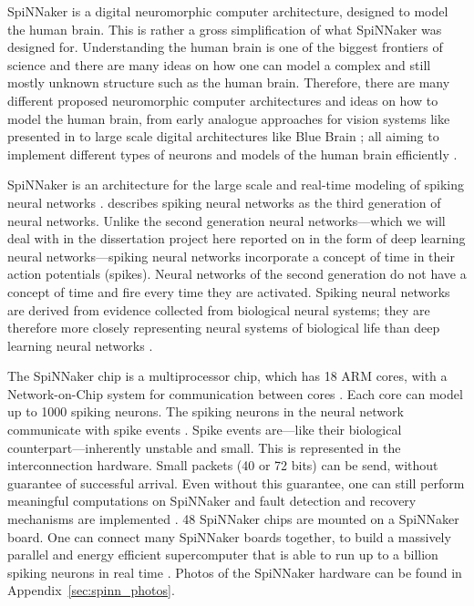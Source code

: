 \documentclass{article}
\begin{document}
SpiNNaker is a digital neuromorphic computer architecture,
designed to model the human brain.
This is rather a gross simplification of what SpiNNaker was
designed for.
Understanding the human brain is one of the biggest
frontiers of science and there are many ideas on how one
can model a complex and still mostly unknown structure such
as the human brain.
Therefore, there are many different proposed neuromorphic
computer architectures and ideas on how to model the human
brain, from early analogue approaches for vision systems
like presented in \citet{mead1989} to large scale digital
architectures like Blue Brain \citep{markram2006}; all
aiming to implement different types of neurons and models
of the human brain efficiently \citep{furber_et_al_2007}.

SpiNNaker is an architecture for the large scale and
real-time modeling of spiking neural networks
\citep{furber_et_al_2006, furber_et_al_2006b,
  furber_et_al_2007}.
\citet{maass1997} describes spiking neural networks as the
third generation of neural networks.
Unlike the second generation neural networks---which we
will deal with in the dissertation project here reported on
in the form of deep learning neural networks---spiking
neural networks incorporate a concept of time in their
action potentials (spikes).
Neural networks of the second generation do not have a
concept of time and fire every time they are activated.
Spiking neural networks are derived from evidence
collected from biological neural systems; they are
therefore more closely representing neural systems of
biological life than deep learning neural networks
\citep{maass1997}.

The SpiNNaker chip is a multiprocessor chip, which has 18 ARM
cores, with a Network-on-Chip system for
communication between cores \citep{furber_et_al_2007,
  spinn_proj}.
Each core can model up to 1000 spiking neurons.
The spiking neurons in the neural network communicate with
spike events \citep{furber_et_al_2007}.
Spike events are---like their biological
counterpart---inherently unstable and small.
This is represented in the interconnection hardware.
Small packets (40 or 72 bits) can be send, without
guarantee of successful arrival.
Even without this guarantee, one can still perform
meaningful computations on SpiNNaker and fault detection
and recovery mechanisms are implemented \citep{spinn_proj}.
48 SpiNNaker chips are mounted on a SpiNNaker board.
One can connect many SpiNNaker boards together, to build a
massively parallel and energy efficient supercomputer that
is able to run up to a billion spiking neurons in real time
\citep{furber_et_al_2007}.
Photos of the SpiNNaker hardware can be found in
Appendix~\ref{sec:spinn_photos}.
\end{document}

